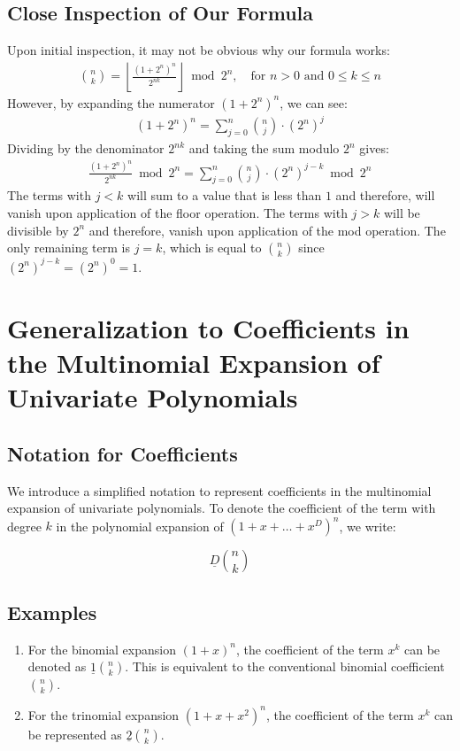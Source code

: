 \documentclass{article}
\theoremstyle{plain}
\begin{document}
\subsection{Close Inspection of Our Formula}
Upon initial inspection, it may not be obvious why our formula works:
\begin{align*}
\binom{n}{k} = \left\lfloor\frac{(1 + 2^{n})^{n}}{2^{n k}}\right\rfloor \bmod{2^{n}}, \quad \text{for } n > 0 \text{ and } 0 \leq k \leq n
\end{align*}
However, by expanding the numerator $(1 + 2^{n})^{n}$, we can see:
\begin{align}
(1 + 2^{n})^{n} = \sum_{j=0}^{n} \binom{n}{j} \cdot (2^n)^{j}
\end{align}
Dividing by the denominator $2^{n k}$ and taking the sum modulo $2^n$ gives:
\begin{align}
\frac{(1 + 2^{n})^{n}}{2^{n k}} \bmod{2^n} = \sum_{j=0}^{n} \binom{n}{j} \cdot (2^n)^{j-k} \bmod{2^n}
\end{align}
The terms with $j < k$ will sum to a value that is less than $1$ and therefore, will vanish upon application of the floor operation. The terms with $j > k$ will be divisible by $2^n$ and therefore, vanish upon application of the mod operation. The only remaining term is $j = k$, which is equal to $\binom{n}{k}$ since $(2^n)^{j-k} = (2^n)^0 = 1$.

\section{Generalization to Coefficients in the Multinomial Expansion of Univariate Polynomials}
\subsection{Notation for Coefficients}
We introduce a simplified notation to represent coefficients in the multinomial expansion of univariate polynomials. To denote the coefficient of the term with degree \( k \) in the polynomial expansion of \( (1 + x + \ldots + x^D)^n \), we write:

\[ \underline{D}\binom{n}{k} \]

\subsection*{Examples}
\begin{enumerate}
\item For the binomial expansion \( (1+x)^n \), the coefficient of the term \( x^k \) can be denoted as \( \underline{1}\binom{n}{k} \). This is equivalent to the conventional binomial coefficient \( \binom{n}{k} \).

\item For the trinomial expansion \( (1+x+x^2)^n \), the coefficient of the term \( x^k \) can be represented as \(\underline{2}\binom{n}{k}\).
\end{enumerate}
\end{document}
